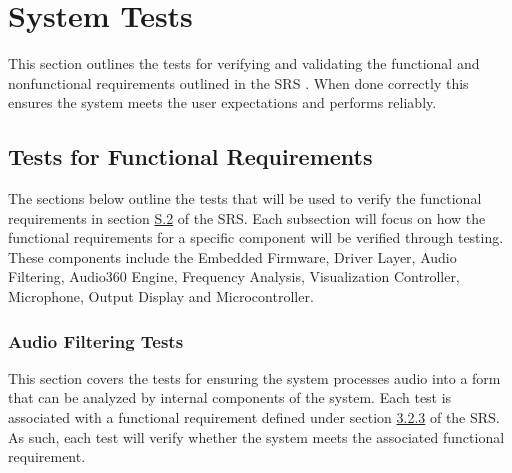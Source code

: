 \documentclass[12pt, titlepage]{article}
\begin{document}
\section{System Tests} \label{sec:system_tests}

This section outlines the tests for verifying and validating the functional and 
nonfunctional requirements outlined in the SRS \citep{SRS}. When done correctly 
this ensures the system meets the user expectations and performs reliably. 

\subsection{Tests for Functional Requirements}

The sections below outline the tests that will be used to verify the functional 
requirements in section \hyperref[SRS-sec:S.2]{S.2} of the SRS. Each subsection 
will focus on how the functional requirements for a specific component will be 
verified through testing. These components include the Embedded Firmware, 
Driver Layer, Audio Filtering, Audio360 Engine, Frequency Analysis, 
Visualization Controller, Microphone, Output Display and Microcontroller. 

\subsubsection{Audio Filtering Tests}

This section covers the tests for ensuring the system processes audio into a 
form that can be analyzed by internal components of the system. Each test is 
associated with a functional requirement defined under section 
\hyperref[SRS-sec:FR3]{3.2.3} of the SRS. As such, each test will verify whether
 the system meets the associated functional requirement. 
\end{document}
